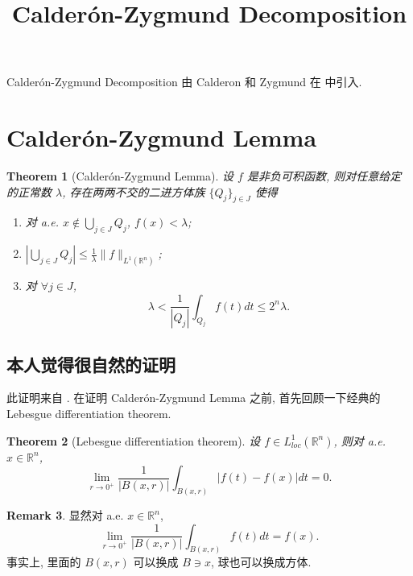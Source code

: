 \documentclass[a4paper,11pt]{article}
\title{Calder\'on-Zygmund Decomposition}
\newtheorem{theorem}{Theorem}[section]
\theoremstyle{definition}
\newtheorem{remark}[theorem]{Remark}
\begin{document}
\begin{CJK*}{UTF8}{gbsn}

\maketitle

Calder\'on-Zygmund Decomposition 由 Calderon 和 Zygmund 在 \cite{cz52} 中引入.

\section{Calder\'on-Zygmund Lemma}

\begin{theorem}[Calder\'on-Zygmund Lemma] \label{C-Z lemma}
    设 $ f $ 是非负可积函数, 则对任意给定的正常数 $ \lambda $, 存在两两不交的二进方体族 $ \{Q_j\}_{j \in J} $ 
    使得
    \begin{enumerate}[{\rm(i)}]
        \item 对 a.e. $ x \notin \bigcup_{j \in J} Q_j $, $ f(x) < \lambda $;
        \item $ | \bigcup_{j \in J} Q_j | \leq \frac{1}{\lambda} \| f \|_{L^1(\mathbb{R}^n)} $;
        \item 对 $ \forall j \in J $, 
            $$
                \lambda < \frac{1}{|Q_j|} \int_{Q_j} f(t) dt \leq 2^n \lambda.
            $$
    \end{enumerate}
\end{theorem}

\subsection{本人觉得很自然的证明}

此证明来自 \cite[Lemma 1.2]{kk13}. 
在证明 Calder\'on-Zygmund Lemma 之前, 首先回顾一下经典的 Lebesgue differentiation theorem.

\begin{theorem}[Lebesgue differentiation theorem]
    设 $ f \in L^1_{loc}(\mathbb{R}^n) $, 则对 a.e. $ x \in \mathbb{R}^n $, 
    $$
        \lim_{r \to 0^+} \frac{1}{|B(x, r)|} \int_{B(x, r)} |f(t) - f(x)| dt = 0.
    $$
\end{theorem}

\begin{remark}
    显然对 a.e. $ x \in \mathbb{R}^n $,
    $$
        \lim_{r \to 0^+} \frac{1}{|B(x, r)|} \int_{B(x, r)} f(t) dt = f(x).
    $$
    事实上, 里面的 $ B(x, r) $ 可以换成 $ B \ni x $, 球也可以换成方体.
\end{remark}


\end{CJK*}
\end{document}
